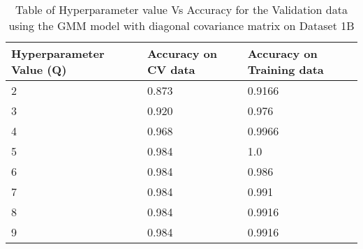
\begin{table}[]
    \centering
    
        \begin{tabular}{|l|l|l|}
        \hline
\textbf{Hyperparameter Value (Q)} &  \textbf{Accuracy on CV data} &  \textbf{Accuracy on Training data}  \\
\hline
\hline
2&0.873&0.9166\\
\hline
3&0.920&0.976\\
\hline
4&0.968&0.9966\\
\hline
5&0.984&1.0\\
\hline
6&0.984&0.986\\
\hline
7&0.984&0.991\\
\hline
8&0.984&0.9916\\
\hline
9&0.984&0.9916\\
\hline
\end{tabular}
\caption{Table of Hyperparameter value Vs Accuracy for the Validation data using the GMM model with diagonal covariance matrix on Dataset 1B}
    \label{tab:conf_train1b}
\end{table}

